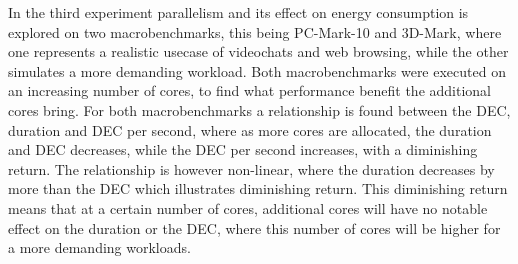 In the third experiment parallelism and its effect on energy consumption is explored on two macrobenchmarks, this being PC-Mark-10 and 3D-Mark, where one represents a realistic usecase of videochats and web browsing, while the other simulates a more demanding workload. Both macrobenchmarks were executed on an increasing number of cores, to find what performance benefit the additional cores bring. For both macrobenchmarks a relationship is found between the DEC, duration and DEC per second, where as more cores are allocated, the duration and DEC decreases, while the DEC per second increases, with a diminishing return. The relationship is however non-linear, where the duration decreases by more than the DEC which illustrates diminishing return. This diminishing return means that at a certain number of cores, additional cores will have no notable effect on the duration or the DEC, where this number of cores will be higher for a more demanding workloads.


